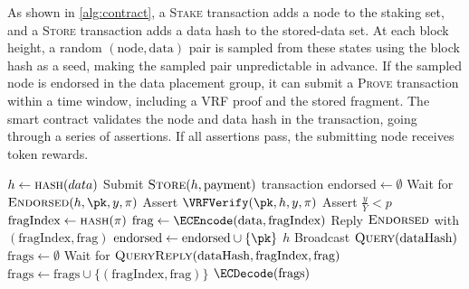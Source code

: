 As shown in \cref{alg:contract}, a \textsc{Stake} transaction adds a node to the staking set, and a \textsc{Store} transaction adds a data hash to the stored-data set.
At each block height, a random $(\text{node}, \text{data})$ pair is sampled from these states using the block hash as a seed, making the sampled pair unpredictable in advance.
If the sampled node is endorsed in the data placement group, it can submit a \textsc{Prove} transaction within a time window, including a VRF proof and the stored fragment.
The smart contract validates the node and data hash in the transaction, going through a series of assertions.
If all assertions pass, the submitting node receives token rewards.


\begin{algorithm}
\caption{Client operations.}
\label{alg:client}
\begin{algorithmic}[1]
    \State $h \gets \textsc{hash}(data)$
    \State Submit $\textsc{Store}(h, \text{payment})$ transaction
    \State $\text{endorsed} \gets \emptyset$
        \State Wait for $\textsc{Endorsed}(h, \pk, y, \pi)$
        \State Assert $\VRFVerify(\pk, h, y, \pi)$
        \State Assert $\frac{y}{Y}<p$
        \State $\text{fragIndex} \gets \textsc{hash}(\pi)$
        \State $\text{frag} \gets \ECEncode(\text{data}, \text{fragIndex})$
        \State Reply $\textsc{Endorsed}$ with $(\text{fragIndex}, \text{frag})$
        \State $\text{endorsed} \gets \text{endorsed} \cup \{\pk\}$
    \EndWhile
    \State \Return $h$
\EndProcedure
{}
    \State Broadcast $\textsc{Query}(\text{dataHash})$
    \State $\text{frags} \gets \emptyset$
        \State Wait for $\textsc{QueryReply}(\text{dataHash}, \text{fragIndex}, \text{frag})$
            \State $\text{frags} \gets \text{frags} \cup \{(\text{fragIndex}, \text{frag})\}$
        \EndIf
    \EndWhile
    \State \Return $\ECDecode(\text{frags})$
\EndProcedure
\end{algorithmic}
\end{algorithm}

